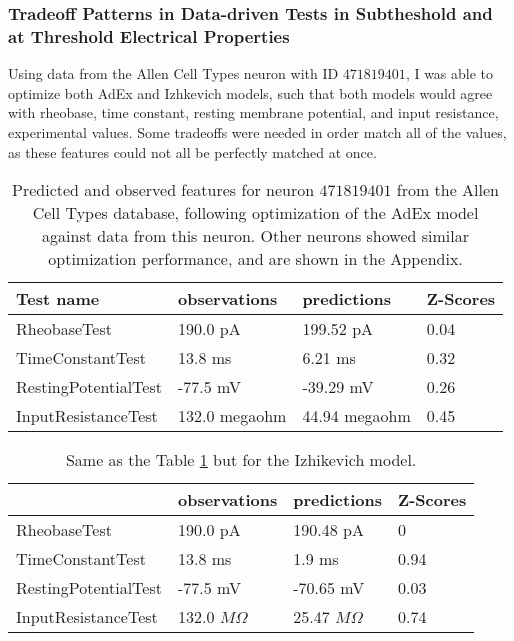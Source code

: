 \subsubsection{Tradeoff Patterns in Data-driven Tests in Subtheshold and at Threshold Electrical Properties}
\label{sec:rh_incomp}
Using data from the Allen Cell Types neuron with ID $471819401$,
I was able to optimize both AdEx and Izhkevich models, such that both models would agree with rheobase, time constant, resting membrane potential, and input resistance, experimental values. Some tradeoffs were needed in order match all of the values, as these features could not all be perfectly matched at once.
\begin{table}
\begin{center}
\begin{tabular}{|l|l|l|l|}
\toprule
Test name &   observations &    predictions & Z-Scores \\
\midrule
RheobaseTest         &       190.0 pA &      199.52 pA &     0.04 \\
TimeConstantTest     &        13.8 ms &        6.21 ms &     0.32 \\
RestingPotentialTest &       -77.5 mV &      -39.29 mV &     0.26 \\
InputResistanceTest  &  132.0 megaohm &  44.94 megaohm &     0.45 \\
\bottomrule
\end{tabular}
\caption[AdEx model fit quality]{Predicted and observed features for neuron $471819401$ from the Allen Cell Types database, following optimization of the AdEx model against data from this neuron.
Other neurons showed similar optimization performance, and are shown in the Appendix.}
\label{tab:adex-allen}
\end{center}
\end{table}

\begin{table}
\begin{center}
\begin{tabular}{|l|l|l|l|}
\toprule
{} &   observations &    predictions & Z-Scores \\
\midrule
RheobaseTest         &       190.0 pA &      190.48 pA &        0 \\
TimeConstantTest     &        13.8 ms &         1.9 ms &     0.94 \\
RestingPotentialTest &       -77.5 mV &      -70.65 mV &     0.03 \\
InputResistanceTest  &  132.0 $M\Omega$ &  25.47 $M\Omega$ &     0.74 \\
\bottomrule
\end{tabular}
\caption[AdEx model fit quality]{Same as the Table \ref{tab:adex-allen} but for the Izhikevich model.}
\label{tab:izhikevich-allen}
\end{center}
\end{table}

